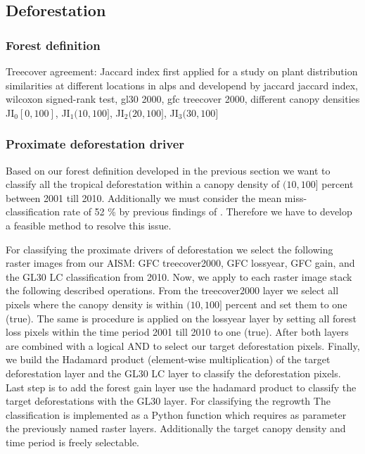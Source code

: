 	\subsection{Deforestation}
		\subsubsection{Forest definition}
			Treecover agreement: Jaccard index first applied for a study on plant distribution similarities at different locations in alps and developend by jaccard \citep{Jaccard1912,Shi1993,Sampat2009} jaccard index, wilcoxon signed-rank test, gl30 2000, gfc treecover 2000, different canopy densities JI$_0$$[0,100]$, JI$_{1}$$(10,100]$, JI$_{2}$$(20,100]$, JI$_{3}$$(30,100]$ 

		\subsubsection{Proximate deforestation driver}
			Based on our forest definition developed in the previous section we want to classify all the tropical deforestation within a canopy density of $(10,100]$ percent between 2001 till 2010. Additionally we must consider the mean miss-classification rate of 52 \% by previous findings of \citeauthor{Seydewitz2017} \citep{Seydewitz2017}. Therefore we have to develop a feasible method to resolve this issue.

			For classifying the proximate drivers of deforestation we select the following raster images from our \ac{AISM}: \ac{GFC} treecover2000, \ac{GFC} lossyear, \ac{GFC} gain, and the \ac{GL30} \ac{LC} classification from 2010. Now, we apply to each raster image stack the following described operations. From the treecover2000 layer we select all pixels where the canopy density is within $(10,100]$ percent and set them to one (true). The same is procedure is applied on the lossyear layer by setting all forest loss pixels within the time period 2001 till 2010 to one (true). After both layers are combined with a logical AND to select our target deforestation pixels. Finally, we build the Hadamard product (element-wise multiplication) of the target deforestation layer and the \ac{GL30} \ac{LC} layer to classify the deforestation pixels. Last step is to add the forest gain layer 
			use the hadamard product to classify the target deforestations with the \ac{GL30} layer. For classifying the regrowth 
			The classification is implemented as a Python function which requires as parameter the previously named raster layers. Additionally the target canopy density and time period is freely selectable.

